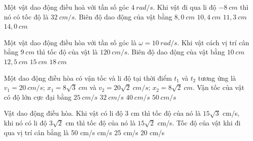 \begin{ex}
Một vật dao động điều hoà với tần số góc $4\ rad/s$. Khi vật đi qua li độ $-8 \ cm$ thì nó có tốc độ là $32 \ cm/s$. Biên độ dao động của vật bằng
\choice
{$8,0\ cm$}
{$10,4\ cm$}
{\True $11,3\ cm$}
{$14,0\ cm$}
\end{ex}
\begin{ex}
Một vật dao động điều hòa với tần số góc là $\omega = 10 \ rad/s$. Khi vật cách vị trí cân bằng $9 \ cm$ thì tốc độ của vật là $120 \ cm/s$. Biên độ dao động của vật bằng
\choice
{$10\ cm$}
{$12,5\ cm$}
{\True $15\ cm$}
{$18\ cm$}
\loigiai{
}
\end{ex}
\begin{ex}
Một dao động điều hòa có vận tốc và li độ tại thời điểm $t_{1}$ và $t_{2}$ tương ứng là  $v_{1}=20 \ cm/s$; $x_{1}=8 \sqrt{3} \ cm$ và $v_{2}=20 \sqrt{2} \ cm/s$; $x_{2}=8 \sqrt{2} \ cm$. Vận tốc của vật có độ lớn cực đại bằng
\choice
{$25\ cm/s$}
{$32\ cm/s$}
{\True $40\ cm/s$}
{$50\ cm/s$}
\end{ex}

\begin{ex}%
Vật dao động điều hòa. Khi vật có li độ 3 cm thì tốc độ của nó là $15\sqrt{3}$ cm/s, khi nó có li độ $3\sqrt{2}$ cm thì tốc độ của nó là $15\sqrt{2}$ cm/s. Tốc độ của vật khi đi qua vị trí cân bằng là
\choice
{50 cm/s}
{ cm/s}
{25 cm/s}
{20 cm/s}
\end{ex} 

